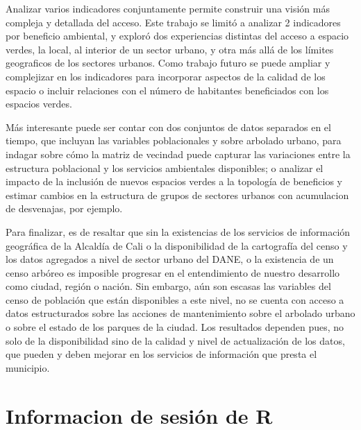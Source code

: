 \documentclass[12pt,a4paper,openany]{book}
\theoremstyle{definition}
\theoremstyle{definition}
\theoremstyle{definition}
\theoremstyle{remark}
\begin{document}
Analizar varios indicadores conjuntamente permite construir una visión
más compleja y detallada del acceso. Este trabajo se limitó a analizar 2
indicadores por beneficio ambiental, y exploró dos experiencias
distintas del acceso a espacio verdes, la local, al interior de un
sector urbano, y otra más allá de los límites geograficos de los
sectores urbanos. Como trabajo futuro se puede ampliar y complejizar en
los indicadores para incorporar aspectos de la calidad de los espacio o
incluir relaciones con el número de habitantes beneficiados con los
espacios verdes.

Más interesante puede ser contar con dos conjuntos de datos separados en
el tiempo, que incluyan las variables poblacionales y sobre arbolado
urbano, para indagar sobre cómo la matriz de vecindad puede capturar las
variaciones entre la estructura poblacional y los servicios ambientales
disponibles; o analizar el impacto de la inclusión de nuevos espacios
verdes a la topología de beneficios y estimar cambios en la estructura
de grupos de sectores urbanos con acumulacion de desvenajas, por
ejemplo.

Para finalizar, es de resaltar que sin la existencias de los servicios
de información geográfica de la Alcaldía de Cali o la disponibilidad de
la cartografía del censo y los datos agregados a nivel de sector urbano
del DANE, o la existencia de un censo arbóreo es imposible progresar en
el entendimiento de nuestro desarrollo como ciudad, región o nación. Sin
embargo, aún son escasas las variables del censo de población que están
disponibles a este nivel, no se cuenta con acceso a datos estructurados
sobre las acciones de mantenimiento sobre el arbolado urbano o sobre el
estado de los parques de la ciudad. Los resultados dependen pues, no
solo de la disponibilidad sino de la calidad y nivel de actualización de
los datos, que pueden y deben mejorar en los servicios de información
que presta el municipio.

\appendix


\chapter{Informacion de sesión de R}\label{informacion-de-sesion-de-r}
\end{document}
